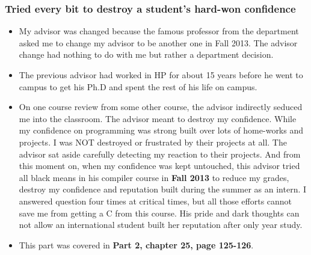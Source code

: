 \documentclass[9pt,b5paper]{article}
\begin{document}
\subsubsection{Tried every bit to destroy a student's hard-won confidence}
\label{sec-12-3-5}
\begin{itemize}
\item My advisor was changed because the famous professor from the department asked me to change my advisor to be another one in Fall 2013. The advisor change had nothing to do with me but rather a department decision.
\item The previous advisor had worked in HP for about 15 years before he went to campus to get his Ph.D and spent the rest of his life on campus.
\item On one course review from some other course, the advisor indirectly seduced me into the classroom. The advisor meant to destroy my confidence. While my confidence on programming was strong built over lots of home-works and projects. I was NOT destroyed or frustrated by their projects at all. The advisor sat aside carefully detecting my reaction to their projects. And from this moment on, when my confidence was kept untouched, this advisor tried all black means in his compiler course in \textbf{Fall 2013} to reduce my grades, destroy my confidence and reputation built during the summer as an intern. I answered question four times at critical times, but all those efforts cannot save me from getting a C from this course. His pride and dark thoughts can not allow an international student built her reputation after only year study.
\item This part was covered in \textbf{Part 2, chapter 25, page 125-126}.
\end{itemize}
\end{document}
